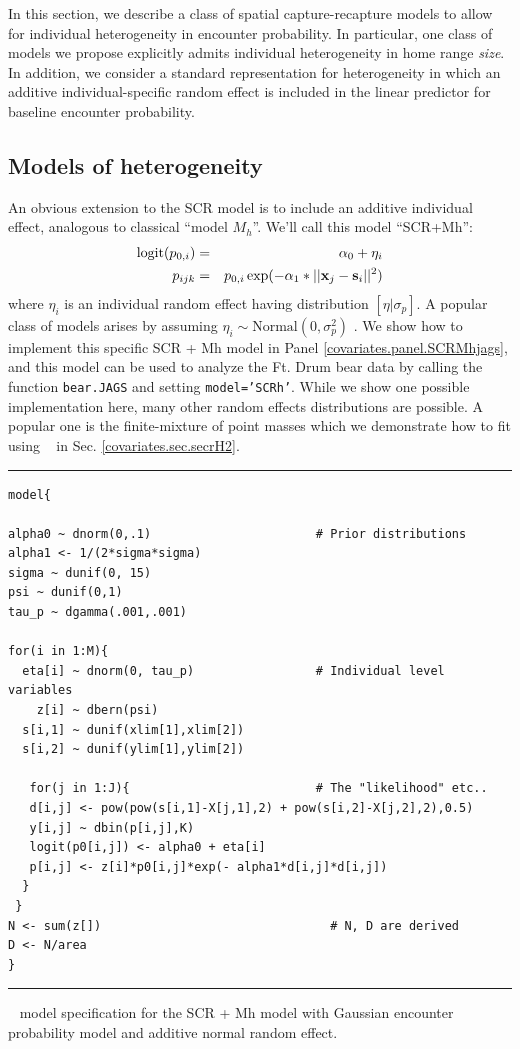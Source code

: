 In this section, we describe a class of spatial capture-recapture
models to allow for individual heterogeneity in encounter
probability.  In particular, one class of models we propose explicitly
admits individual heterogeneity in home range {\it size}. In addition,
we consider a standard representation for heterogeneity in which an
additive individual-specific random effect is included in the linear
predictor for baseline encounter probability.  

\subsection{Models of heterogeneity}
\label{covariates.sec.heterogeneity}

An obvious extension to the SCR model is to include an additive
individual effect, analogous to classical ``model $M_{h}$''. We'll
call this model ``SCR+Mh'':
\begin{eqnarray*}
\mbox{logit}(p_{0,i})& =& \alpha_0 + \eta_{i} \\
p_{ijk}& = &p_{0,i} \exp(- \alpha_1*||{\bf x}_{j}-{\bf s}_{i}||^2)
\end{eqnarray*}
where $\eta_{i}$ is an individual random effect having distribution
$[\eta|\sigma_{p}]$.  A popular class of models arises by assuming
$\eta_{i} \sim \mbox{Normal}(0,\sigma_{p}^{2})$
\citep{coull_agresti:1999, dorazio_royle:2003}.  We show how to
implement this specific SCR + Mh model in Panel
\ref{covariates.panel.SCRMhjags}, and this model can be used to
analyze the Ft. Drum bear data by calling the function {\tt bear.JAGS}
and setting {\tt model='SCRh'}.  While we show one possible
implementation here, many other random effects distributions are
possible. A popular one is the finite-mixture of point masses
\citep{norris_pollock:1996, pledger:2000} which we demonstrate how to
fit using \secr~ in Sec. \ref{covariates.sec.secrH2}.

\begin{panel}[htp]
\centering
\rule[0.1in]{\textwidth}{.03in}
{\small
\begin{verbatim}
model{

alpha0 ~ dnorm(0,.1)                       # Prior distributions
alpha1 <- 1/(2*sigma*sigma)
sigma ~ dunif(0, 15)
psi ~ dunif(0,1)
tau_p ~ dgamma(.001,.001)

for(i in 1:M){
  eta[i] ~ dnorm(0, tau_p)                 # Individual level variables
    z[i] ~ dbern(psi)
  s[i,1] ~ dunif(xlim[1],xlim[2])
  s[i,2] ~ dunif(ylim[1],ylim[2])

   for(j in 1:J){                          # The "likelihood" etc..
   d[i,j] <- pow(pow(s[i,1]-X[j,1],2) + pow(s[i,2]-X[j,2],2),0.5)
   y[i,j] ~ dbin(p[i,j],K)
   logit(p0[i,j]) <- alpha0 + eta[i]
   p[i,j] <- z[i]*p0[i,j]*exp(- alpha1*d[i,j]*d[i,j])
  }
 }
N <- sum(z[])                                # N, D are derived
D <- N/area
}
\end{verbatim}
}

\rule[-0.1in]{\textwidth}{.03in}
\caption{
\jags~ model specification for the SCR + Mh model with Gaussian
encounter 
probability model and additive normal random effect.
}
\label{covariates.panel.SCRMhjags}
\end{panel}




